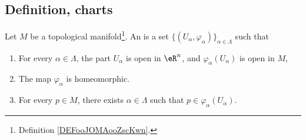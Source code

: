\subsection{Definition, charts}

\begin{definition}		\label{DEFooRUVIooSZDjlE}
	Let \( M\) be a topological manifold\footnote{Definition \ref{DEFooJOMAooZscKwn}.}. An  is a set \( \{ (U_{\alpha}, \varphi_{\alpha})\}_{\alpha\in\Lambda}\) such that
	\begin{enumerate}
		\item
		      For every \( \alpha\in\Lambda\), the part \( U_{\alpha}\) is open in \( \eR^n\), and \( \varphi_{\alpha}(U_{\alpha})\) is open in \( M\),
		\item
		      The map \( \varphi_{\alpha}\) is homeomorphic.
		\item
		      For every \( p\in M\), there exists \( \alpha\in \Lambda\) such that \( p\in \varphi_{\alpha}(U_{\alpha})\).
	\end{enumerate}
\end{definition}

